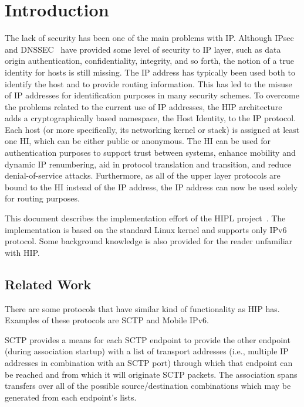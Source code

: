 %

\section{Introduction}
\label{sec:introduction}

The lack of security has been one of the main problems with
IP. Although \ac{IPsec}~\cite{rfc2401} and \ac{DNSSEC}~\cite{rfc3008}
have provided some level of security to IP layer, such as data origin
authentication, confidentiality, integrity, and so forth, the notion
of a true identity for hosts is still missing. The IP address has
typically been used both to identify the host and to provide routing
information. This has led to the misuse of IP addresses for
identification purposes in many security schemes. To overcome the
problems related to the current use of IP addresses, the \ac{HIP}
architecture adds a cryptographically based namespace, the Host
Identity, to the IP protocol.  Each host (or more specifically, its
networking kernel or stack) is assigned at least one \ac{HI}, which
can be either public or anonymous. The \ac{HI} can be used for
authentication purposes to support trust between systems, enhance
mobility and dynamic IP renumbering, aid in protocol translation and
transition, and reduce denial-of-service attacks. Furthermore, as all
of the upper layer protocols are bound to the \ac{HI} instead of the
IP address, the IP address can now be used solely for routing
purposes.

This document describes the implementation effort of the \ac{HIPL}
project~\cite{hipl}. The implementation is based on the standard Linux
kernel and supports only IPv6 protocol. Some background knowledge is
also provided for the reader unfamiliar with \ac{HIP}.

\subsection{Related Work}
\label{sec:related_work}

There are some protocols that have similar kind of functionality as
\ac{HIP} has. Examples of these protocols are \ac{SCTP} and Mobile
IPv6.

\ac{SCTP} provides a means for each \ac{SCTP} endpoint to provide the
other endpoint (during association startup) with a list of transport
addresses (i.e., multiple IP addresses in combination with an
\ac{SCTP} port) through which that endpoint can be reached and from
which it will originate \ac{SCTP} packets. The association spans
transfers over all of the possible source/destination combinations
which may be generated from each endpoint's lists. \cite{rfc2960}

